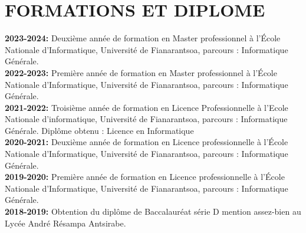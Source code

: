 \documentclass[12pt]{report}
\begin{document}
			\section*{FORMATIONS ET DIPLOME}
			\begin{center}
				\begin{minipage}{\textwidth}
					\textbf{2023-2024:} Deuxième année de formation en Master professionnel à l’École Nationale d'Informatique, Université de Fianarantsoa, parcours : Informatique Générale.\\[0.5cm]
					\textbf{2022-2023:} Première année de formation en Master professionnel à l’École Nationale d'Informatique, Université de Fianarantsoa, parcours : Informatique Générale.\\[0.5cm]
					\textbf{2021-2022:} Troisième année de formation en Licence Professionnelle à l’Ecole Nationale d’informatique, Université de Fianarantsoa, parcours : Informatique Générale. Diplôme obtenu : Licence en Informatique\\[0.5cm]
					\textbf{2020-2021:} Deuxième année de formation en Licence professionnelle à l’École Nationale d'Informatique, Université de Fianarantsoa, parcours : Informatique Générale.\\[0.5cm]
					\textbf{2019-2020:} Première année de formation en Licence professionnelle à l’École Nationale d'Informatique, Université de Fianarantsoa, parcours : Informatique Générale.\\[0.5cm]
					\textbf{2018-2019:} Obtention du diplôme de Baccalauréat série D mention assez-bien au Lycée André Résampa Antsirabe.
				\end{minipage}
			\end{center}
\end{document}
